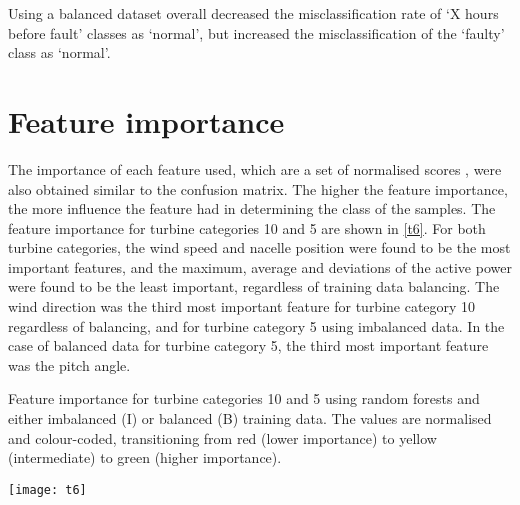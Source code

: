 Using a balanced dataset overall decreased the misclassification rate of `X hours before fault' classes as `normal', but increased the misclassification of the `faulty' class as `normal'.

\section{Feature importance}

The importance of each feature used, which are a set of normalised scores \cite{Rudy13}, were also obtained similar to the confusion matrix. The higher the feature importance, the more influence the feature had in determining the class of the samples. The feature importance for turbine categories 10 and 5 are shown in \autoref{t6}. For both turbine categories, the wind speed and nacelle position were found to be the most important features, and the maximum, average and deviations of the active power were found to be the least important, regardless of training data balancing. The wind direction was the third most important feature for turbine category 10 regardless of balancing, and for turbine category 5 using imbalanced data. In the case of balanced data for turbine category 5, the third most important feature was the pitch angle.

\begin{table}
  \centering
  \caption{\label{t6}Feature importance for turbine categories 10 and 5 using random forests and either imbalanced (I) or balanced (B) training data. The values are normalised and colour-coded, transitioning from red (lower importance) to yellow (intermediate) to green (higher importance).}
  \texttt{[image: t6]}
\end{table}
